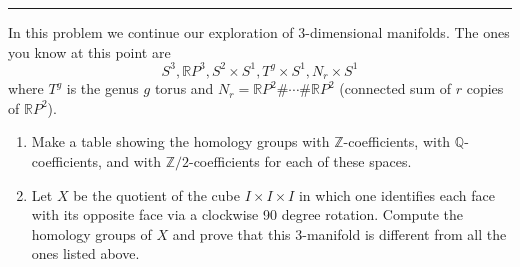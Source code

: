 \documentclass[a4paper, 12pt]{article}
\begin{document}
\noindent\rule{7in}{2.8pt}
\begin{problem}{5}
In this problem we continue our exploration of \(3\)-dimensional manifolds. The ones you know at this point are 
\[S^3, \mathbb{R}P^3, S^2\times S^1, T^g\times S^1, N_r\times S^1\]
where \(T^g\) is the genus \(g\) torus and \(N_r=\mathbb{R}P^2\#\cdots\# \mathbb{R}P^2\) (connected sum of \(r\) copies of \(\mathbb{R}P^2\)). 
\begin{enumerate}
\item Make a table showing the homology groups with \(\mathbb{Z}\)-coefficients, with \(\mathbb{Q}\)-coefficients, and with \(\mathbb{Z}/2\)-coefficients for each of these spaces. 
\item Let \(X\) be the quotient of the cube \(I\times I\times I\) in which one identifies each face with its opposite face via a clockwise 90 degree rotation. Compute the homology groups of \(X\) and prove that 
this 3-manifold is different from all the ones listed above. 
\end{enumerate}
\end{problem}
\end{document}
